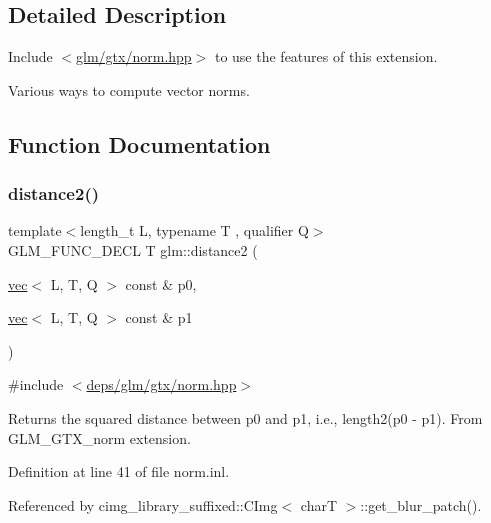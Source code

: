 \subsection{Detailed Description}
Include $<$\hyperlink{norm_8hpp}{glm/gtx/norm.\+hpp}$>$ to use the features of this extension.

Various ways to compute vector norms. 

\subsection{Function Documentation}
\mbox{\label{group__gtx__norm_ga85660f1b79f66c09c7b5a6f80e68c89f}} 
\subsubsection{\texorpdfstring{distance2()}{distance2()}}
{\footnotesize\ttfamily template$<$length\+\_\+t L, typename T , qualifier Q$>$ \\
G\+L\+M\+\_\+\+F\+U\+N\+C\+\_\+\+D\+E\+CL T glm\+::distance2 (\begin{DoxyParamCaption}\item[{\hyperlink{structglm_1_1vec}{vec}$<$ L, T, Q $>$ const \&}]{p0,  }\item[{\hyperlink{structglm_1_1vec}{vec}$<$ L, T, Q $>$ const \&}]{p1 }\end{DoxyParamCaption})}



{\ttfamily \#include $<$\hyperlink{norm_8hpp}{deps/glm/gtx/norm.\+hpp}$>$}

Returns the squared distance between p0 and p1, i.\+e., length2(p0 -\/ p1). From G\+L\+M\+\_\+\+G\+T\+X\+\_\+norm extension. 

Definition at line 41 of file norm.\+inl.



Referenced by cimg\+\_\+library\+\_\+suffixed\+::\+C\+Img$<$ char\+T $>$\+::get\+\_\+blur\+\_\+patch().


